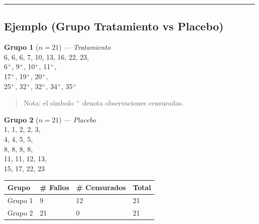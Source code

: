 \documentclass[
]{article}
\begin{document}
\begin{center}\rule{0.5\linewidth}{0.5pt}\end{center}

\subsection{Ejemplo (Grupo Tratamiento vs
Placebo)}\label{ejemplo-grupo-tratamiento-vs-placebo}

\begin{tcolorbox}[enhanced jigsaw, arc=.35mm, coltitle=black, opacitybacktitle=0.6, colbacktitle=quarto-callout-note-color!10!white, breakable, toprule=.15mm, titlerule=0mm, colframe=quarto-callout-note-color-frame, colback=white, bottomrule=.15mm, leftrule=.75mm, rightrule=.15mm, bottomtitle=1mm, toptitle=1mm, opacityback=0, left=2mm, title=\textcolor{quarto-callout-note-color}{\faInfo}\hspace{0.5em}{Ejemplo: Tiempos de remisión (semanas) para dos grupos de pacientes con
leucemia}]

\textbf{Grupo 1} (\(n = 21\)) --- \emph{Tratamiento}\\
6, 6, 6, 7, 10, 13, 16, 22, 23,\\
6\(^+\), 9\(^+\), 10\(^+\), 11\(^+\),\\
17\(^+\), 19\(^+\), 20\(^+\),\\
25\(^+\), 32\(^+\), 32\(^+\), 34\(^+\), 35\(^+\)

\begin{quote}
Nota: el símbolo \(^+\) denota observaciones censuradas.
\end{quote}

\textbf{Grupo 2} (\(n = 21\)) --- \emph{Placebo}\\
1, 1, 2, 2, 3,\\
4, 4, 5, 5,\\
8, 8, 8, 8,\\
11, 11, 12, 13,\\
15, 17, 22, 23

\begin{longtable}[]{@{}llll@{}}
\toprule\noalign{}
Grupo & \# Fallos & \# Censurados & Total \\
\midrule\noalign{}
\endhead
\bottomrule\noalign{}
\endlastfoot
Grupo 1 & 9 & 12 & 21 \\
Grupo 2 & 21 & 0 & 21 \\
\end{longtable}

\end{tcolorbox}
\end{document}
